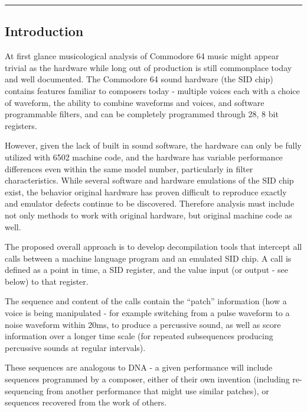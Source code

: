 \documentclass[10pt]{article}
\begin{document}
        \begin{center}
                \rule{150mm}{0.2mm}
        \end{center}

        \vspace{5mm}

\begin{multicols*}{2}

  \section{Introduction}

  At first glance musicological analysis of Commodore 64 music might
  appear trivial as the hardware while long out of production is still
  commonplace today and well documented. The Commodore 64 sound
  hardware (the SID chip) contains features familiar to composers
  today - multiple voices each with a choice of waveform, the ability
  to combine waveforms and voices, and software programmable filters,
  and can be completely programmed through 28, 8 bit registers.

  However, given the lack of built in sound software, the hardware can
  only be fully utilized with 6502 machine code, and the hardware has
  variable performance differences even within the same model number,
  particularly in filter characteristics. While several software and
  hardware emulations of the SID chip exist, the behavior original
  hardware has proven difficult to reproduce exactly and emulator
  defects continue to be discovered.  Therefore analysis must include
  not only methods to work with original hardware, but original
  machine code as well.

  The proposed overall approach is to develop decompilation tools
  that intercept all calls between a machine language program and an
  emulated SID chip. A call is defined as a point in time, a SID
  register, and the value input (or output - see below) to that
  register.

  The sequence and content of the calls contain the ``patch''
  information (how a voice is being manipulated - for example
  switching from a pulse waveform to a noise waveform within 20ms, to
  produce a percussive sound, as well as score information over a
  longer time scale (for repeated subsequences producing percussive
  sounds at regular intervals).

  These sequences are analogous to DNA - a given performance will
  include sequences programmed by a composer, either of their own
  invention (including re-sequencing from another performance that
  might use similar patches), or sequences recovered from the work of
  others.


\end{multicols*}
\end{document}
